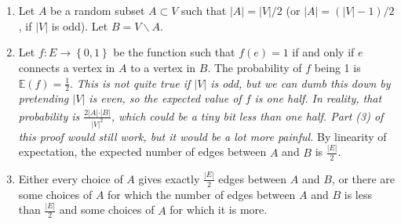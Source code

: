 \documentclass[12pt]{article}
\begin{document}
\section{}
\noindent{}\bigskip\par
\begin{enumerate}
    \item Let $A$ be a random subset $A \subset V$ such that $|A|=|V|/2$ (or $|A|=(|V|-1)/2$, if $|V|$ is odd). Let $B=V \backslash A$.
    \item Let $f: E \rightarrow \left\{ 0,1 \right\}$ be the function such that $f(e)=1$ if and only if $e$ connects a vertex in $A$ to a vertex in $B$. The probability of $f$ being 1 is $\mathbb{E}(f)= \frac{1}{2}$. \textit{This is not quite true if $|V|$ is odd, but we can dumb this down by pretending $|V|$ is even, so the expected value of $f$ is one half. In reality, that probability is $\frac{2 \dot |A|\cdot|B|}{|V|^2}$, which could be a tiny bit less than one half. Part (3) of this proof would still work, but it would be a lot more painful.} By linearity of expectation, the expected number of edges between $A$ and $B$ is $\frac{|E|}{2}$.
    \item Either every choice of $A$ gives exactly $\frac{|E|}{2}$ edges between $A$ and $B$, or there are some choices of $A$ for which the number of edges between $A$ and $B$ is less than $\frac{|E|}{2}$ and some choices of $A$ for which it is more.
\end{enumerate}
\end{document}
